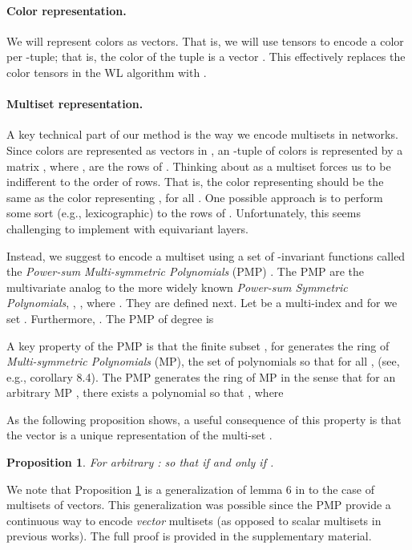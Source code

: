\documentclass{article}
\newtheorem{proposition}{Proposition}
\newcommand{\eg}{{e.g.}}
\newcommand{\revision}[1]{{\color{black} #1}}
\begin{document}
\paragraph{Color representation.}\vspace{-3pt}
We will represent colors as vectors. That is, we will use tensors  to encode a color per -tuple; that is, the color of the tuple  is a vector . This effectively replaces the color tensors  in the WL algorithm with .

\vspace{-3pt}
\paragraph{Multiset representation.}\vspace{-3pt}
A key technical part of our method is the way we encode multisets in networks. Since colors are represented as vectors in , an -tuple of colors is represented by a matrix , where ,  are the rows of . Thinking about  as a multiset forces us to be indifferent to the order of rows. That is, the color representing  should be the same as the color representing , for all . One possible approach is to perform some sort (\eg, lexicographic) to the rows of . Unfortunately, this seems challenging to implement with equivariant layers. 

Instead, we suggest to encode a multiset  using a set of -invariant functions called the \emph{Power-sum Multi-symmetric Polynomials} (PMP) \citep{briand2004algebra,rydh2007minimal}. The PMP are the multivariate analog to the more widely known \emph{Power-sum Symmetric Polynomials}, , , where . They are defined next. 
Let  be a multi-index and for  we set . Furthermore, . The PMP of degree  is 
 



A key property of the PMP is that the finite subset , for  generates the ring of \emph{Multi-symmetric Polynomials} (MP), the set of polynomials  so that  for all ,  (see, \eg,  \citep{rydh2007minimal} corollary 8.4). The PMP generates the ring of MP in the sense that for an arbitrary MP , there exists a polynomial  so that , where

As the following proposition shows, a useful consequence of this property is that the vector  is a unique representation of the multi-set . 
\begin{proposition}\label{prop:u}
For arbitrary :  so that  if and only if . 
\end{proposition}
We note that Proposition \ref{prop:u} is a generalization of lemma 6 in \citet{zaheer2017deep} to the case of multisets of vectors. \revision{This generalization was possible since the PMP  provide a continuous way to encode \textit{vector} multisets (as opposed to scalar multisets in previous works). } The full proof is provided in the supplementary material.
\end{document}
